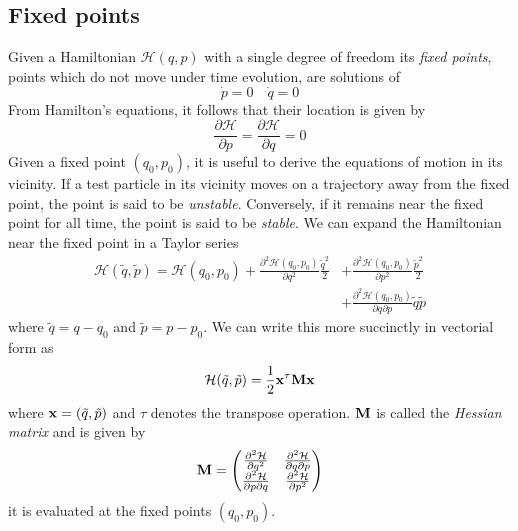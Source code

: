 \documentclass[ twoside,openright,titlepage,numbers=noenddot,headinclude,%
                footinclude=true,cleardoublepage=empty,abstractoff, %
                BCOR=5mm,paper=a4,fontsize=11pt,%
                american,%
                ]{scrreprt}
\begin{document}
\subsection{Fixed points}
Given a Hamiltonian $\mathcal{H}(q,p)$ with a single degree of freedom
its \emph{fixed points}, points which do not move under time evolution,
are solutions of
\begin{equation}
    \dot{p}=0\quad\dot{q}=0
\end{equation}
From 
Hamilton's equations, it follows that their location is given by
\begin{equation}
   \frac{\partial \mathcal{H}}{\partial p}= \frac{\partial \mathcal{H}}{\partial q}=0
\end{equation}
Given a fixed point $(q_0,p_0)$, it is useful to derive the equations
of motion in its vicinity. If a test particle in its vicinity moves 
on a trajectory away from the fixed point, the point is said to be
\emph{unstable}. Conversely, if it remains near the fixed point for all 
time, the point is said to be \emph{stable}. We can expand the Hamiltonian
near the fixed point in a Taylor series
\begin{align}
    \mathcal{H}(\tilde q, \tilde p)=\mathcal{H}(q_0,p_0) 
    + \frac{\partial^2\mathcal{H}(q_0,p_0)}{\partial q^2} \frac{\tilde q^2}{2} 
    &+\frac{\partial^2\mathcal{H}(q_0,p_0)}{\partial p^2} \frac{\tilde p^2}{2} \nonumber\\
    &+\frac{\partial^2\mathcal{H}(q_0,p_0)}{\partial q\partial p}\tilde q\tilde p 
\end{align}
where $\tilde q=q-q_0$ and $\tilde p=p-p_0$. We can write this more succinctly 
in vectorial form as
\begin{equation}
    \mathcal{H}(\tilde q,\tilde p)= \frac{1}{2} \boldsymbol{\mathbf{x}}^\tau\boldsymbol{\mathbf{M}}\boldsymbol{\mathbf{x}}
\end{equation}
where $\boldsymbol{\mathbf{x}}=(\tilde q, \tilde p)$ and $\tau$ denotes the transpose 
operation. $\boldsymbol{\mathbf{M}}$ is called the \emph{Hessian matrix} and is given by
\begin{equation}
    \boldsymbol{\mathbf{M}}=
    \begin{pmatrix}
        \frac{\partial^2 \mathcal{H}}{\partial q^2} &
        \frac{\partial^2 \mathcal{H}}{\partial q\partial p }\\
        \frac{\partial^2 \mathcal{H}}{\partial p \partial q} &
        \frac{\partial^2 \mathcal{H}}{\partial p^2} 
    \end{pmatrix}
    \label{eq:fixed_points_stability}
\end{equation}
it is evaluated at the fixed points $(q_0,p_0)$.
\end{document}

